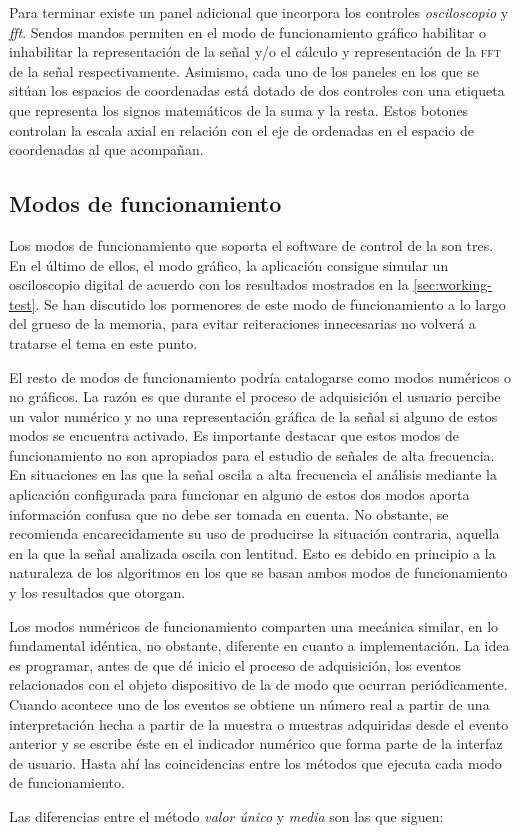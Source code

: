 Para terminar existe un panel adicional que incorpora los controles \emph{osciloscopio} y \emph{fft}. Sendos mandos permiten en el modo de funcionamiento gráfico habilitar o inhabilitar la representación de la señal y/o el cálculo y representación de la \textsc{fft} de la señal respectivamente. Asimismo, cada uno de los paneles en los que se sitúan los espacios de coordenadas está dotado de dos controles con una etiqueta que representa los signos matemáticos de la suma y la resta. Estos botones controlan la escala axial en relación con el eje de ordenadas en el espacio de coordenadas al que acompañan.


\subsection{Modos de funcionamiento}\label{subsec:working-modes}

Los modos de funcionamiento que soporta el software de control de la \kpci{} son tres. En el último de ellos, el modo gráfico, la aplicación consigue simular un osciloscopio digital de acuerdo con los resultados mostrados en la \vref{sec:working-test}. Se han discutido los pormenores de este modo de funcionamiento a lo largo del grueso de la memoria, para evitar reiteraciones innecesarias no volverá a tratarse el tema en este punto.\par
El resto de modos de funcionamiento podría catalogarse como modos numéricos o no gráficos. La razón es que durante el proceso de adquisición el usuario percibe un valor numérico y no una representación gráfica de la señal si alguno de estos modos se encuentra activado. Es importante destacar que estos modos de funcionamiento no son apropiados para el estudio de señales de alta frecuencia. En situaciones en las que la señal oscila a alta frecuencia el análisis mediante la aplicación configurada para funcionar en alguno de estos dos modos aporta información confusa que no debe ser tomada en cuenta. No obstante, se recomienda encarecidamente su uso de producirse la situación contraria, aquella en la que la señal analizada oscila con lentitud. Esto es debido en principio a la naturaleza de los algoritmos en los que se basan ambos modos de funcionamiento y los resultados que otorgan.\par %
Los modos numéricos de funcionamiento comparten una mecánica similar, en lo fundamental idéntica, no obstante, diferente en cuanto a implementación. La idea es programar, antes de que dé inicio el proceso de adquisición, los eventos relacionados con el objeto dispositivo de la \datx{} de modo que ocurran periódicamente. Cuando acontece uno de los eventos se obtiene un número real a partir de una interpretación hecha a partir de la muestra o muestras adquiridas desde el evento anterior y se escribe éste en el indicador numérico que forma parte de la interfaz de usuario. Hasta ahí las coincidencias entre los métodos que ejecuta cada modo de funcionamiento.\par %
Las diferencias entre el método \emph{valor único} y \emph{media} son las que siguen:

